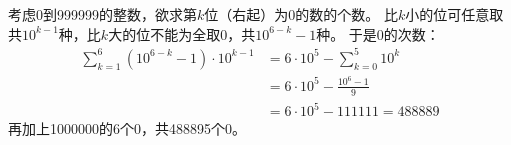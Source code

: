 \begin{solution}
    考虑0到999999的整数，欲求第$k$位（右起）为0的数的个数。
    比$k$小的位可任意取共$10^{k-1}$种，比$k$大的位不能为全取0，共$10^{6-k}-1$种。
    于是0的次数：
    \begin{align*}
        \sum_{k=1}^6(10^{6-k}-1)\cdot 10^{k-1} &= 6\cdot 10^5-\sum_{k=0}^5 10^k\\
        &= 6\cdot 10^5 - \frac{10^6-1}{9}\\
        &= 6\cdot 10^5 - 111111 = 488889
    \end{align*}
    再加上1000000的6个0，共488895个0。
\end{solution}